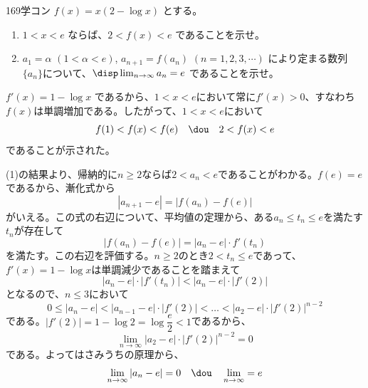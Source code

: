 \begin{prob}{169}{}{学コン}
 $f(x)=x(2-\log x)$ とする。
 \begin{enumerate}
  \item $1<x<e$ ならば、$2<f(x)<e$ であることを示せ。
  \item $a_1=\alpha$ $(1<\alpha <e)$, $a_{n+1}=f(a_n)$ $(n=1, 2, 3, \cdots)$ により定まる数列$\{a_n\}$について、$\disp \lim_{n\to\infty} a_n = e$ であることを示せ。
 \end{enumerate}
\end{prob}
$f'(x)=1-\log x$ であるから、$1<x<e$において常に$f'(x)>0$、すなわち$f(x)$は単調増加である。したがって、$1<x<e$において
\[ f(1)<f(x)<f(e) \quad\dou\quad 2<f(x)<e \]
であることが示された。

(1)の結果より、帰納的に$n\ge 2$ならば$2<a_n<e$であることがわかる。$f(e)=e$であるから、漸化式から
\[ |a_{n+1}-e|=|f(a_n)-f(e)| \]
がいえる。この式の右辺について、平均値の定理から、ある$a_n\le t_n \le e$を満たす$t_n$が存在して
\[ |f(a_n)-f(e)|=|a_n-e|\cdot f'(t_n) \]
を満たす。この右辺を評価する。$n\ge 2$のとき$2<t_n\le e$であって、$f'(x)=1-\log x$は単調減少であることを踏まえて
\[ |a_n-e|\cdot |f'(t_n)| < |a_n-e|\cdot |f'(2)| \]
となるので、$n\le 3$において
\[ 0\le |a_n-e|<|a_{n-1}-e|\cdot |f'(2)|<\dots< |a_2-e|\cdot |f'(2)|^{n-2} \]
である。$|f'(2)|=1-\log 2=\log \dfrac{e}{2}<1$であるから、
\[ \lim_{n\to\infty} |a_2-e|\cdot |f'(2)|^{n-2}=0 \]
である。よってはさみうちの原理から、
\[ \lim_{n\to\infty} |a_n-e|=0 \quad\dou\quad \lim_{n\to\infty} =e \]